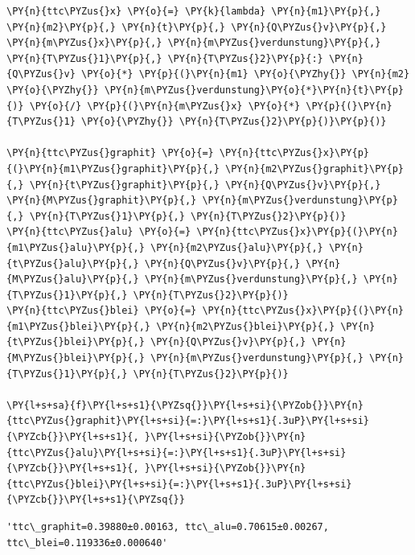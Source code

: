 \begin{tcolorbox}[breakable, size=fbox, boxrule=1pt, pad at break*=1mm,colback=cellbackground, colframe=cellborder]
\begin{Verbatim}[commandchars=\\\{\}]
\PY{n}{ttc\PYZus{}x} \PY{o}{=} \PY{k}{lambda} \PY{n}{m1}\PY{p}{,} \PY{n}{m2}\PY{p}{,} \PY{n}{t}\PY{p}{,} \PY{n}{Q\PYZus{}v}\PY{p}{,} \PY{n}{m\PYZus{}x}\PY{p}{,} \PY{n}{m\PYZus{}verdunstung}\PY{p}{,} \PY{n}{T\PYZus{}1}\PY{p}{,} \PY{n}{T\PYZus{}2}\PY{p}{:} \PY{n}{Q\PYZus{}v} \PY{o}{*} \PY{p}{(}\PY{n}{m1} \PY{o}{\PYZhy{}} \PY{n}{m2} \PY{o}{\PYZhy{}} \PY{n}{m\PYZus{}verdunstung}\PY{o}{*}\PY{n}{t}\PY{p}{)} \PY{o}{/} \PY{p}{(}\PY{n}{m\PYZus{}x} \PY{o}{*} \PY{p}{(}\PY{n}{T\PYZus{}1} \PY{o}{\PYZhy{}} \PY{n}{T\PYZus{}2}\PY{p}{)}\PY{p}{)}

\PY{n}{ttc\PYZus{}graphit} \PY{o}{=} \PY{n}{ttc\PYZus{}x}\PY{p}{(}\PY{n}{m1\PYZus{}graphit}\PY{p}{,} \PY{n}{m2\PYZus{}graphit}\PY{p}{,} \PY{n}{t\PYZus{}graphit}\PY{p}{,} \PY{n}{Q\PYZus{}v}\PY{p}{,} \PY{n}{M\PYZus{}graphit}\PY{p}{,} \PY{n}{m\PYZus{}verdunstung}\PY{p}{,} \PY{n}{T\PYZus{}1}\PY{p}{,} \PY{n}{T\PYZus{}2}\PY{p}{)}
\PY{n}{ttc\PYZus{}alu} \PY{o}{=} \PY{n}{ttc\PYZus{}x}\PY{p}{(}\PY{n}{m1\PYZus{}alu}\PY{p}{,} \PY{n}{m2\PYZus{}alu}\PY{p}{,} \PY{n}{t\PYZus{}alu}\PY{p}{,} \PY{n}{Q\PYZus{}v}\PY{p}{,} \PY{n}{M\PYZus{}alu}\PY{p}{,} \PY{n}{m\PYZus{}verdunstung}\PY{p}{,} \PY{n}{T\PYZus{}1}\PY{p}{,} \PY{n}{T\PYZus{}2}\PY{p}{)}
\PY{n}{ttc\PYZus{}blei} \PY{o}{=} \PY{n}{ttc\PYZus{}x}\PY{p}{(}\PY{n}{m1\PYZus{}blei}\PY{p}{,} \PY{n}{m2\PYZus{}blei}\PY{p}{,} \PY{n}{t\PYZus{}blei}\PY{p}{,} \PY{n}{Q\PYZus{}v}\PY{p}{,} \PY{n}{M\PYZus{}blei}\PY{p}{,} \PY{n}{m\PYZus{}verdunstung}\PY{p}{,} \PY{n}{T\PYZus{}1}\PY{p}{,} \PY{n}{T\PYZus{}2}\PY{p}{)}

\PY{l+s+sa}{f}\PY{l+s+s1}{\PYZsq{}}\PY{l+s+si}{\PYZob{}}\PY{n}{ttc\PYZus{}graphit}\PY{l+s+si}{=:}\PY{l+s+s1}{.3uP}\PY{l+s+si}{\PYZcb{}}\PY{l+s+s1}{, }\PY{l+s+si}{\PYZob{}}\PY{n}{ttc\PYZus{}alu}\PY{l+s+si}{=:}\PY{l+s+s1}{.3uP}\PY{l+s+si}{\PYZcb{}}\PY{l+s+s1}{, }\PY{l+s+si}{\PYZob{}}\PY{n}{ttc\PYZus{}blei}\PY{l+s+si}{=:}\PY{l+s+s1}{.3uP}\PY{l+s+si}{\PYZcb{}}\PY{l+s+s1}{\PYZsq{}}
\end{Verbatim}
\end{tcolorbox}

            \begin{tcolorbox}[breakable, size=fbox, boxrule=.5pt, pad at break*=1mm, opacityfill=0]
\begin{Verbatim}[commandchars=\\\{\}]
'ttc\_graphit=0.39880±0.00163, ttc\_alu=0.70615±0.00267,
ttc\_blei=0.119336±0.000640'
\end{Verbatim}
\end{tcolorbox}
        
